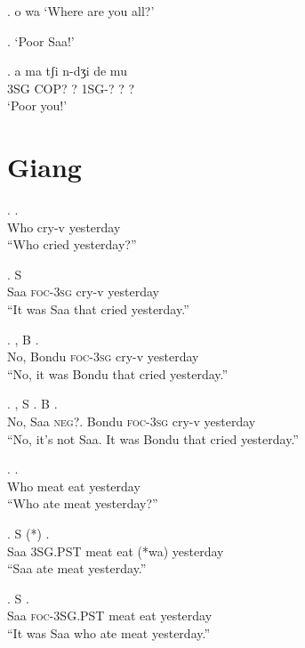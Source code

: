 \documentclass{assets/fieldnotes}
\begin{document}

\ex. o wa
`Where are you all?'


\ex. `Poor Saa!'

\exg. a ma tʃi n-dʒi de mu \\
3SG COP? ? 1SG-? ? ?\\
`Poor you!'


\section{Giang}
\exg.   .\\
Who cry-v yesterday\\
``Who cried yesterday?''

\exg. S   \\
Saa \textsc{foc}-\textsc{3sg} cry-v yesterday\\
``It was Saa that cried yesterday.''

\exg. , B   .\\
No, Bondu \textsc{foc}-\textsc{3sg} cry-v yesterday\\
``No, it was Bondu that cried yesterday.''

\exg. , S . B   .\\
No, Saa \textsc{neg?}. Bondu \textsc{foc}-\textsc{3sg} cry-v yesterday\\
``No, it's not Saa. It was Bondu that cried yesterday.''

\exg.    .\\
Who meat eat yesterday\\
``Who ate meat yesterday?''

\exg. S    (*) .\\
Saa \textsc{3SG.PST} meat eat (*wa) yesterday\\
``Saa ate meat yesterday.''

\exg. S    .\\
Saa \textsc{foc-3SG.PST} meat eat yesterday\\
``It was Saa who ate meat yesterday.''
\end{document}
